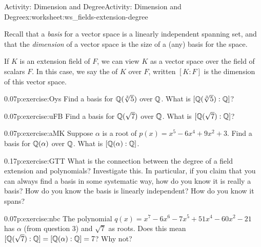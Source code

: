 \documentclass[11pt]{book}
\begin{document}
%
%
\typeout{************************************************}
\typeout{************************************************}
%
\begin{worksheet-subsection}{Activity: Dimension and Degree}{}{Activity: Dimension and Degree}{}{}{x:worksheet:ws_fields-extension-degree}
\begin{introduction}{}%
Recall that a \emph{basis} for a vector space is a linearly independent spanning set, and that the \emph{dimension} of a vector space is the size of a (any) basis for the space.%
\par
If \(K\) is an extension field of \(F\), we can view \(K\) as a vector space over the field of scalars \(F\).  In this case, we say the  of \(K\) over \(F\), written \([K:F]\) is the dimension of this vector space.%
\end{introduction}%
\begin{divisionexercise}{1}{}{0.07}{p:exercise:Oys}%
Find a basis for \(\mathbb{Q}(\sqrt[3]{5})\) over \(\mathbb{Q}\).  What is \([\mathbb{Q}(\sqrt[3]{5}):\mathbb{Q}]\)?%
\end{divisionexercise}%
\begin{divisionexercise}{2}{}{0.07}{p:exercise:uFB}%
Find a basis for \(\mathbb{Q}(\sqrt{7})\) over \(\mathbb{Q}\).  What is \([\mathbb{Q}(\sqrt{7}):\mathbb{Q}]\)?%
\end{divisionexercise}%
\begin{divisionexercise}{3}{}{0.07}{p:exercise:aMK}%
Suppose \(\alpha\) is a root of \(p(x) = x^5 -6x^4 + 9x^2 + 3\).  Find a basis for \(\mathbb{Q}(\alpha)\) over \(\mathbb{Q}\).  What is \([\mathbb{Q}(\alpha):\mathbb{Q}]\).%
\end{divisionexercise}%
\begin{divisionexercise}{4}{}{0.17}{p:exercise:GTT}%
What is the connection between the degree of a field extension and polynomials?  Investigate this.  In particular, if you claim that you can always find a basis in some systematic way, how do you know it is really a basis?  How do you know the basis is linearly independent?  How do you know it spans?%
\end{divisionexercise}%
\begin{divisionexercise}{5}{}{0.07}{p:exercise:nbc}%
The polynomial \(q(x) = x^7-6 x^6-7 x^5+51 x^4-60 x^2-21\) has \(\alpha\) (from question 3) and \(\sqrt{7}\) as roots.  Does this mean \([\mathbb{Q}(\sqrt{7}):\mathbb{Q}] = [\mathbb{Q}(\alpha):\mathbb{Q}] = 7\)?  Why not?%
\end{divisionexercise}%
\end{worksheet-subsection}
\restoregeometry
\end{document}
